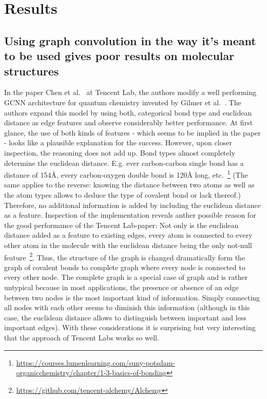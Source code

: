 \chapter{Results}
\label{chapter:Results}


\section{Using graph convolution in the way it's meant to be used gives poor results on molecular structures}

In the paper Chen et al.~\cite{Chen2019} at Tencent Lab, the authors modify a well performing GCNN architecture for quantum chemistry invented by Gilmer et al.~\cite{Gilmer2017}. The authors expand this model by using both, categorical bond type and euclidean distance as edge features and observe considerably better performance. At first glance, the use of both kinds of features - which seems to be implied in the paper - looks like a plausible explanation for the success. However, upon closer inspection, the reasoning does not add up. Bond types almost completely determine the euclidean distance. E.g. ever carbon-carbon single bond has a distance of 154Å, every carbon-oxygen double bond is 120Å long, etc.~\footnote{\url{https://courses.lumenlearning.com/suny-potsdam-organicchemistry/chapter/1-3-basics-of-bonding}} (The same applies to the reverse: knowing the distance between two atoms as well as the atom types allows to deduce the type of covalent bond or lack thereof.) Therefore, no additional information is added by including the euclidean distance as a feature. Inspection of the implementation reveals anther possible reason for the good performance of the Tencent Lab-paper: Not only is the euclidean distance added as a feature to existing edges, every atom is connected to every other atom in the molecule with the euclidean distance being the only not-null feature~\footnote{\url{https://github.com/tencent-alchemy/Alchemy}}. Thus, the structure of the graph is changed dramatically form the graph of covalent bonds to complete graph where every node is connected to every other node. The complete graph is a special case of graph and is rather untypical because in most applications, the presence or absence of an edge between two nodes is the most important kind of information. Simply connecting all nodes with each other seems to diminish this information (although in this case, the euclidean distance allows to distinguish between important and less important edges). With these considerations it is surprising but very interesting that the approach of Tencent Labs works so well.

